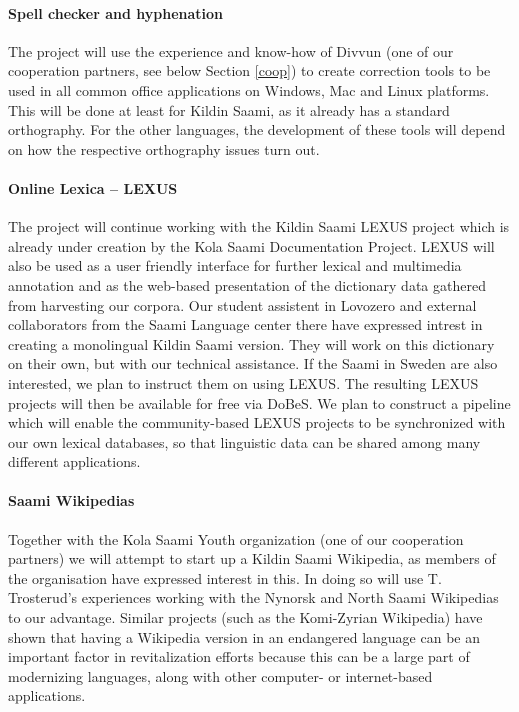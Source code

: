 \documentclass[a4paper,12pt]{article}
\begin{document}
\paragraph{Spell checker and hyphenation} 
The project will use the experience and know-how of Divvun (one of our cooperation partners, see below Section \ref{coop}) to create correction tools to be used in all common office applications on Windows, Mac and Linux platforms. This will be done at least for Kildin Saami, as it already has a standard orthography. For the other languages, the development of these tools will depend on how the respective orthography issues turn out.

\paragraph{Online Lexica – LEXUS}
The project will continue working with the Kildin Saami LEXUS project which is already under creation by the Kola Saami Documentation Project. LEXUS will also be used as a user friendly interface for further lexical and multimedia annotation and as the web-based presentation of the dictionary data gathered from harvesting our corpora. Our student assistent in Lovozero and external collaborators from the Saami Language center there have expressed intrest in creating a monolingual Kildin Saami version. 
They will work on this dictionary on their own, but with our technical assistance. If the Saami in Sweden are also interested, we plan to instruct them on using LEXUS. The resulting LEXUS projects will then be available for free via DoBeS.
We plan to construct a pipeline which will enable the community-based LEXUS projects to be synchronized with our own lexical databases, so that
linguistic data can be shared among many different applications.

\paragraph{Saami Wikipedias}
Together with the Kola Saami Youth organization (one of our cooperation partners) we will attempt to start up a Kildin Saami Wikipedia, as members of the organisation have expressed interest in this. In doing so will use T.\,Trosterud's experiences working with the Nynorsk and North Saami Wikipedias to our advantage. Similar projects (such as the Komi-Zyrian Wikipedia) have shown that having a Wikipedia version in an endangered language can be an important factor in revitalization efforts because this can be a large part of modernizing languages, along with other computer- or internet-based applications. 
\end{document}
